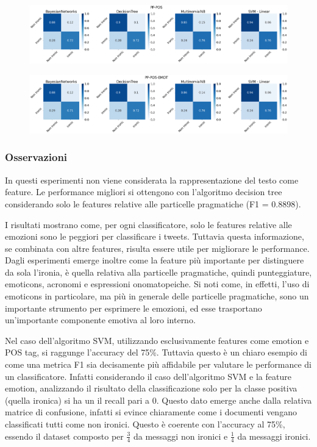 \documentclass[oneside]{book}
\begin{document}
\begin{figure}[H]
	\centering
	\includegraphics[width=13cm]{assets/reports/conf-matrix/nobow/pp-pos.png}
\end{figure}
\vspace*{-0.8cm}

\begin{figure}[H]
	\centering
	\includegraphics[width=13cm]{assets/reports/conf-matrix/nobow/pp-pos-emot.png}
\end{figure}
\vspace*{-0.8cm}
\restoregeometry
\newpage

\subsubsection{Osservazioni}
In questi esperimenti non viene considerata la rappresentazione del testo come feature. Le performance migliori si ottengono con l'algoritmo decision tree considerando solo le features relative alle particelle pragmatiche (F1 = 0.8898).

I risultati mostrano come, per ogni classificatore, solo le features relative alle emozioni sono le peggiori per classificare i tweets. Tuttavia questa informazione, se combinata con altre features, risulta essere utile per migliorare le performance. Dagli esperimenti emerge inoltre come la feature più importante per distinguere da sola l'ironia, è quella relativa alla particelle pragmatiche, quindi punteggiature, emoticons, acronomi e espressioni onomatopeiche. Si noti come, in effetti, l'uso di emoticons in particolare, ma più in generale delle particelle pragmatiche, sono un importante strumento per esprimere le emozioni, ed esse trasportano un'importante componente emotiva al loro interno.

Nel caso dell'algoritmo SVM, utilizzando esclusivamente features come emotion e POS tag, si raggunge l'accuracy del 75\%. Tuttavia questo è un chiaro esempio di come una metrica F1 sia decisamente più affidabile per valutare le performance di un classificatore. Infatti considerando il caso dell'algoritmo SVM e la feature emotion, analizzando il risultato della classificazione solo per la classe positiva (quella ironica) si ha un il recall pari a 0. Questo dato emerge anche dalla relativa matrice di confusione, infatti si evince chiaramente come i documenti vengano classificati tutti come non ironici. Questo è coerente con l'accuracy al 75\%, essendo il dataset composto per $\frac{3}{4}$ da messaggi non ironici e $\frac{1}{4}$ da messaggi ironici.
\end{document}
